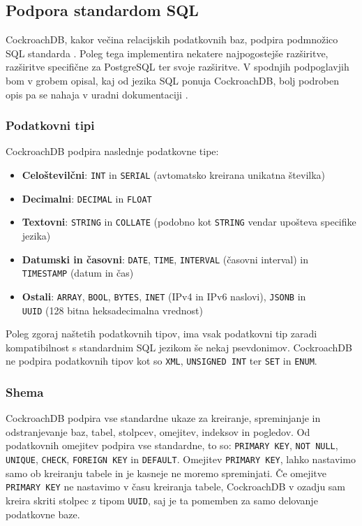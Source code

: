 \documentclass[a4paper, 12pt]{book}
\begin{document}
\subsection{Podpora standardom SQL}
CockroachDB, kakor večina relacijskih podatkovnih baz, podpira podmnožico SQL standarda \cite{CRDB-sql-standard}. Poleg tega implementira nekatere najpogostejše raz\-ši\-rit\-ve, razširitve specifične za PostgreSQL ter svoje razširitve. V spodnjih podpoglavjih bom v grobem opisal, kaj od jezika SQL ponuja CockroachDB, bolj podroben opis pa se nahaja v uradni dokumentaciji \cite{CRDB-sql-features}.

\subsubsection{Podatkovni tipi}
CockroachDB podpira naslednje podatkovne tipe:

\begin{itemize}
    \item \textbf{Celoštevilčni}: \texttt{INT} in \texttt{SERIAL} (avtomatsko kreirana unikatna številka)
    \item \textbf{Decimalni}: \texttt{DECIMAL} in \texttt{FLOAT}
    \item \textbf{Textovni}: \texttt{STRING} in \texttt{COLLATE} (podobno kot \texttt{STRING} vendar upošteva specifike jezika)
    \item \textbf{Datumski in časovni}: \texttt{DATE}, \texttt{TIME}, \texttt{INTERVAL} (časovni interval) in\\\texttt{TIMESTAMP} (datum in čas)
    \item \textbf{Ostali}: \texttt{ARRAY}, \texttt{BOOL}, \texttt{BYTES}, \texttt{INET} (IPv4 in IPv6 naslovi), \texttt{JSONB} in\\\texttt{UUID} (128 bitna heksadecimalna vrednost)
\end{itemize}

\noindent Poleg zgoraj naštetih podatkovnih tipov, ima vsak podatkovni tip zaradi kompatibilnost s standardnim SQL jezikom še nekaj psevdonimov. CockroachDB ne podpira podatkovnih tipov kot so \texttt{XML}, \texttt{UNSIGNED INT} ter \texttt{SET} in \texttt{ENUM}.

\newpage
\subsubsection{Shema}
CockroachDB podpira vse standardne ukaze za kreiranje, spreminjanje in odstranjevanje baz, tabel, stolpcev, omejitev, indeksov in pogledov. Od podatkovnih omejitev podpira vse standardne, to so: \texttt{PRIMARY KEY}, \texttt{NOT NULL}, \texttt{UNIQUE}, \texttt{CHECK}, \texttt{FOREIGN KEY} in \texttt{DEFAULT}. Omejitev \texttt{PRIMARY KEY}, lahko nastavimo samo ob kreiranju tabele in je kasneje ne moremo spreminjati. Če omejitve \texttt{PRIMARY KEY} ne nastavimo v času kreiranja tabele, CockroachDB v ozadju sam kreira skriti stolpec z tipom \texttt{UUID}, saj je ta pomemben za samo delovanje podatkovne baze.
\end{document}
